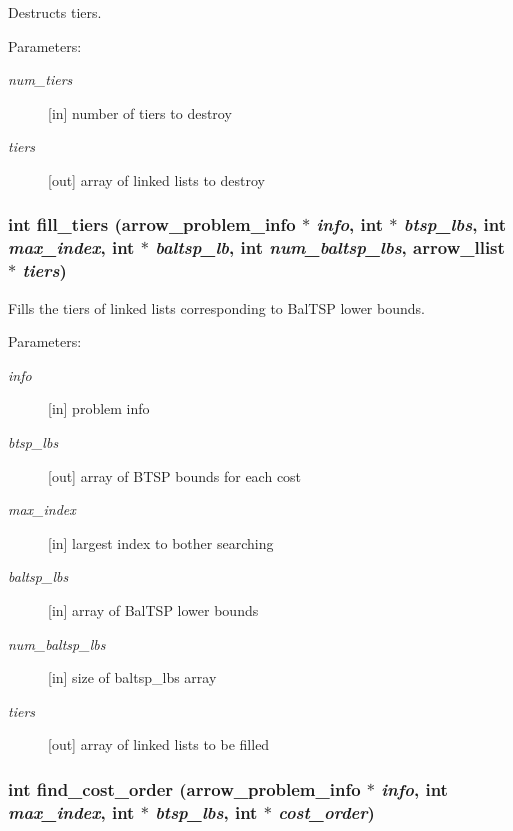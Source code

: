 Destructs tiers. 

\begin{Desc}
\item[Parameters:]
\begin{description}
\item[{\em num\_\-tiers}]\mbox{[}in\mbox{]} number of tiers to destroy \item[{\em tiers}]\mbox{[}out\mbox{]} array of linked lists to destroy \end{description}
\end{Desc}
\hypertarget{lib_2baltsp_2baltsp-lb_8c_42c557c4a5d3133300ce63b8b5e291c5}{
\subsubsection[{fill\_\-tiers}]{\setlength{\rightskip}{0pt plus 5cm}int fill\_\-tiers ({\bf arrow\_\-problem\_\-info} $\ast$ {\em info}, \/  int $\ast$ {\em btsp\_\-lbs}, \/  int {\em max\_\-index}, \/  int $\ast$ {\em baltsp\_\-lb}, \/  int {\em num\_\-baltsp\_\-lbs}, \/  {\bf arrow\_\-llist} $\ast$ {\em tiers})}}
\label{lib_2baltsp_2baltsp-lb_8c_42c557c4a5d3133300ce63b8b5e291c5}


Fills the tiers of linked lists corresponding to BalTSP lower bounds. 

\begin{Desc}
\item[Parameters:]
\begin{description}
\item[{\em info}]\mbox{[}in\mbox{]} problem info \item[{\em btsp\_\-lbs}]\mbox{[}out\mbox{]} array of BTSP bounds for each cost \item[{\em max\_\-index}]\mbox{[}in\mbox{]} largest index to bother searching \item[{\em baltsp\_\-lbs}]\mbox{[}in\mbox{]} array of BalTSP lower bounds \item[{\em num\_\-baltsp\_\-lbs}]\mbox{[}in\mbox{]} size of baltsp\_\-lbs array \item[{\em tiers}]\mbox{[}out\mbox{]} array of linked lists to be filled \end{description}
\end{Desc}
\hypertarget{lib_2baltsp_2baltsp-lb_8c_fe2b4359a26c49fe7602c86021b91ee7}{
\subsubsection[{find\_\-cost\_\-order}]{\setlength{\rightskip}{0pt plus 5cm}int find\_\-cost\_\-order ({\bf arrow\_\-problem\_\-info} $\ast$ {\em info}, \/  int {\em max\_\-index}, \/  int $\ast$ {\em btsp\_\-lbs}, \/  int $\ast$ {\em cost\_\-order})}}
\label{lib_2baltsp_2baltsp-lb_8c_fe2b4359a26c49fe7602c86021b91ee7}


